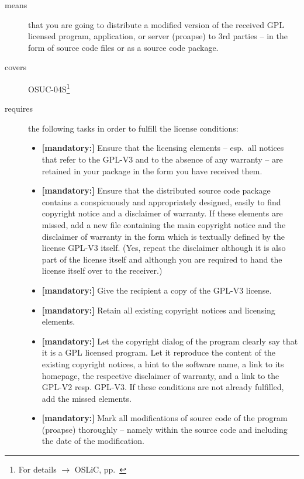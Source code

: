 \begin{description}
\item[means] that you are going to distribute a modified version of the received
GPL licensed program, application, or server (proapse) to 3rd parties -- in the
form of source code files or as a source code package.
\item[covers] OSUC-04S\footnote{For details $\rightarrow$ OSLiC, pp.\
\pageref{OSUC-04S-DEF}}

\item[requires] the following tasks in order to fulfill the license conditions:
\begin{itemize}
  
  \item \textbf{[mandatory:]} Ensure that the licensing elements -- esp.\ all
  notices that refer to the GPL-V3 and to the absence of any
  warranty -- are retained in your package in the form you have received them.

  \item \textbf{[mandatory:]} Ensure that the distributed source code package
  contains a conspicuously and appropriately designed, easily to find copyright
  notice and a disclaimer of warranty. If these elements are missed, add a new
  file containing the main copyright notice and the disclaimer of warranty in the
  form which is textually defined by the license GPL-V3 itself. (Yes, repeat
  the disclaimer although it is also part of the license itself and although you
  are required to hand the license itself over to the receiver.)
  
  \item \textbf{[mandatory:]} Give the recipient a copy of the GPL-V3 license.  
  
  \item \textbf{[mandatory:]} Retain all existing copyright notices and
  licensing elements.
  
  \item \textbf{[mandatory:]} Let the copyright dialog of the program clearly
  say that it is a GPL licensed program. Let it reproduce the content of the
  existing copyright notices, a hint to the software name, a link to its
  homepage, the respective disclaimer of warranty, and a link to the GPL-V2
  resp. GPL-V3. If these conditions are not already fulfilled, add the missed
  elements.

  \item \textbf{[mandatory:]} Mark all modifications of source code of the
  program (proapse) thoroughly -- namely within the source code and including
  the date of the modification.
  

\end{itemize}
\end{description}
